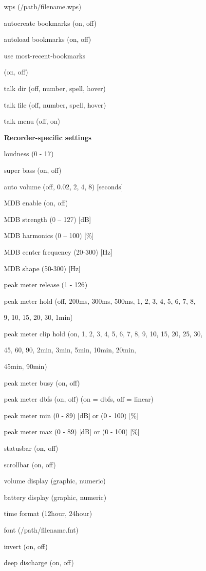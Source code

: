 wps    (/path/filename.wps)

autocreate bookmarks (on, off)

autoload bookmarks (on, off)

use most{}-recent{}-bookmarks

    (on, off)

talk dir   (off, number, spell, hover)

talk file   (off, number, spell, hover)

talk menu   (off, on)

{\bfseries
Recorder{}-specific settings}

loudness   (0 {}- 17)

super bass    (on, off)

auto volume  (off, 0.02, 2, 4, 8) [seconds]

MDB enable  (on, off)

MDB strength  (0 {--} 127) [dB]

MDB harmonics  (0 {--} 100) [\%]

MDB center frequency (20{}-300) [Hz]

MDB shape   (50{}-300) [Hz]

peak meter release (1 {}- 126)

peak meter hold  (off, 200ms, 300ms, 500ms, 1, 2, 3, 4, 5, 6, 7, 8,

      9, 10, 15, 20, 30, 1min)

peak meter clip hold (on, 1, 2, 3, 4, 5, 6, 7, 8, 9, 10, 15, 20, 25, 30,


     45, 60, 90, 2min, 3min, 5min, 10min, 20min,

     45min, 90min)

peak meter busy  (on, off)

peak meter dbfs  (on, off) (on = dbfs, off = linear)

peak meter min  (0 {}- 89) [dB] or (0 {}- 100) [\%]

peak meter max  (0 {}- 89) [dB] or (0 {}- 100) [\%]

statusbar   (on, off)

scrollbar   (on, off)

volume display  (graphic, numeric)

battery display  (graphic, numeric)

time format   (12hour, 24hour)

font    (/path/filename.fnt)

invert    (on, off)

deep discharge  (on, off)

